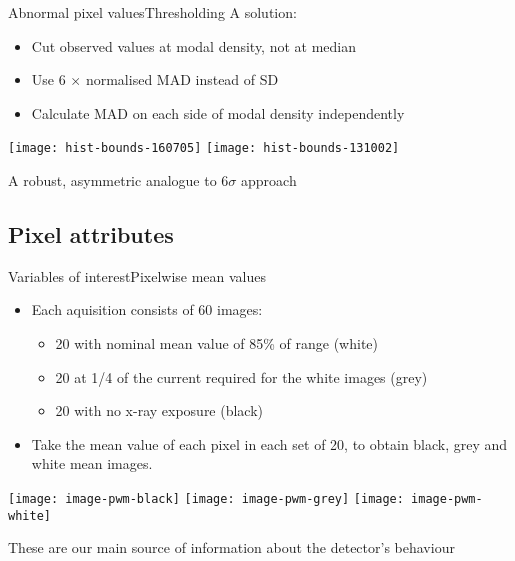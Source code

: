 \documentclass[8pt]{beamer}
\begin{document}

\begin{frame}{Abnormal pixel values}{Thresholding}
	A solution:
	\begin{itemize}
		\item Cut observed values at modal density, not at median
		\item Use 6 $\times$ normalised MAD instead of SD							%
		\item Calculate MAD on each side of modal density independently
	\end{itemize}
	
	\begin{center}
		\texttt{[image: hist-bounds-160705]}
		\texttt{[image: hist-bounds-131002]}
	\end{center}
	A robust, asymmetric analogue to $6\sigma$ approach
	
\end{frame}


\subsection{Pixel attributes}

\begin{frame}{Variables of interest}{Pixelwise mean values}
	\begin{itemize}
		\item Each aquisition consists of 60 images:
		\begin{itemize}
			\item 20 with nominal mean value of 85\% of range (white)
			\item 20 at 1/4 of the current required for the white images (grey)
			\item 20 with no x-ray exposure (black)
		\end{itemize}
		\item Take the mean value of each pixel in each set of 20, to obtain black, grey and white mean images. 
	\end{itemize}
	
	\begin{center}
		\texttt{[image: image-pwm-black]}
		\texttt{[image: image-pwm-grey]}
		\texttt{[image: image-pwm-white]}
	\end{center}
	These are our main source of information about the detector's behaviour
\end{frame}
\end{document}
